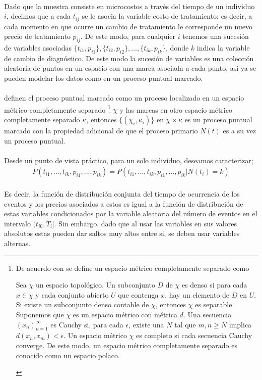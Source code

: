 \\
Dado que la muestra consiste en microcostos a trav\'es del tiempo de un individuo $i$, decimos que a cada $t_{ij}$ se le asocia la variable costo de tratamiento; es decir, a cada momento en que ocurre un cambio de tratamiento le corresponde un nuevo precio de tratamiento $p_{ij}$. De este modo, para cualquier $i$ tenemos una sucesi\'on de variables asociadas $\{t_{i1},p_{i1}\},\{t_{i2},p_{i2}\},...,\{t_{ik},p_{ik}\}$, donde $k$ indica la variable de cambio de diagn\'ostico. De este modo la sucesi\'on de variables es una colecci\'on aleatoria de puntos en un espacio con una marca asociada a cada punto, as\'i ya se pueden modelar los datos como en un proceso puntual marcado.\\
\\
\cite{daley2003} definen el proceso puntual marcado como un proceso localizado en un espacio m\'etrico completamente separado \footnote{De acuerdo con \cite{schervish2012theory} se define un espacio m\'etrico completamente separado como
\begin{defi}
Sea $\chi$ un espacio topol\'ogico. Un subconjunto $D$ de $\chi$ es denso si para cada $x \in \chi$ y cada conjunto abierto $U$ que contenga $x$, hay un elemento de $D$ en $U$. Si existe un subconjunto denso contable de $\chi$, entonces $\chi$ es separable. Suponemos que $\chi$ es un espacio m\'etrico con m\'etrica $d$. Una secuencia $(x_n)_{n=1}^{\infty}$ es Cauchy si, para cada $\epsilon$, existe una $N$ tal que $m,n \geq N$ implica $d(x_n,x_m) <\epsilon$. Un espacio m\'etrico $\chi$ es completo si cada secuencia Cauchy converge. De este modo, un espacio m\'etrico completamente separado es conocido como un espacio polaco.
\end{defi}} $\chi$ y las marcas en otro espacio m\'etrico completamente separado $\kappa$, entonces $\{(\chi_i,\kappa_i)\}$ en $\chi \times \kappa$ es un proceso puntual marcado con la propiedad adicional de que el proceso primario $N(t)$ es a su vez un proceso puntual.\\
\\
Desde un punto de vista pr\'actico, para un solo individuo, deseamos caracterizar;
\begin{align}
P(t_{i1},...,t_{ik},p_{i1},...,p_{ik})=P(t_{i1},...,t_{ik},p_{i1},...,p_{ik}|N(t_i)=k)
\end{align}
\\
Es decir, la funci\'on de distribuci\'on conjunta del tiempo de ocurrencia de los eventos y los precios asociados a estos es igual a la funci\'on de distribuci\'on de estas variables condicionados por la variable aleatoria del n\'umero de eventos en el intervalo $(t_{i0},T_i]$. Sin embargo, dado que al usar las variables en sus valores absolutos estas pueden dar saltos muy altos entre si, se deben usar variables alternas.\\
